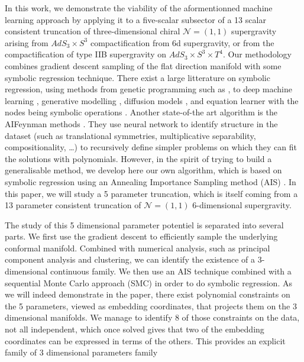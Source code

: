 \documentclass[11pt]{article}
\begin{document}
In this work, we demonstrate the viability of the aformentionned machine learning approach by applying it to a five-scalar subsector of a 13 scalar consistent truncation of three-dimensional chiral $\mathcal{N} = (1,1)$  supergravity arising from $AdS_3 \times S^3$ compactification from 6d supergravity, or from the compactification of type IIB supergravity on $AdS_3 \times S^3 \times T^4$. Our methodology combines gradient descent sampling of the flat direction manifold with some symbolic regression technique. There exist a large litterature on symbolic regression, using methods from genetic programming \cite{koza1994genetic} such as \cite{virgolin2021improving,randall2022bingo,burlacu2019parsimony}, to deep machine learning \cite{petersen2019deep,kamienny2022end}, generative modelling \cite{valipour2021symbolicgpt}, diffusion models \cite{bastiani2025diffusion}, and equation learner with the nodes being symbolic operations \cite{2018arXiv180607259S}. Another state-of-the art algorithm is the AIFeynman methods \cite{Udrescu:2019mnk}. They use neural network to identify structure in the dataset (such as translational symmetries, multiplicative separability, compositionality, \dots) to recursively define simpler problems on which they can fit the solutions with polynomials.  However, in the spirit of trying to build a generalisable method, we develop here our own algorithm, which is based on symbolic regression using an Annealing Importance Sampling method (AIS) \cite{neal1998annealedimportancesampling}. In this paper, we will study a 5 parameter truncation, which is itself coming from a 13 parameter consistent truncation of $\mathcal{N} = (1,1)$ 6-dimensional supergravity. 

The study of this 5 dimensional parameter potentiel is separated into several parts. We first use the gradient descent to efficiently sample the underlying conformal manifold. Combined with numerical analysis, such as principal component analysis and clustering, we can identify the existence of a 3-dimensional continuous family. We then use an AIS technique combined with a sequential Monte Carlo approach (SMC) \cite{del2006sequential} in order to do symbolic regression. As we will indeed demonstrate in the paper, there exist polynomial constraints on the 5 parameters, viewed as embedding coordinates, that projects them on the 3 dimensional manifolds. We manage to identify 8 of those constraints on the data, not all independent, which once solved gives that two of the embedding coordinates can be expressed in terms of the others. This provides an explicit family of 3 dimensional parameters family 
\end{document}
